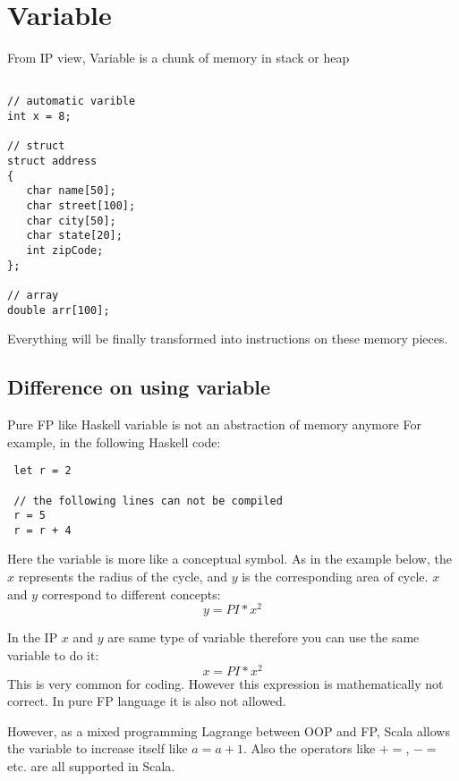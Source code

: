 \documentclass[notheorems, aspectratio=54]{beamer}
\begin{document}
\section{Variable}
\begin{frame}[fragile]

\begin{block}{From IP view, Variable is a chunk of memory in stack or heap}
\begin{verbatim}

// automatic varible
int x = 8;

// struct 
struct address 
{ 
   char name[50]; 
   char street[100]; 
   char city[50]; 
   char state[20]; 
   int zipCode;
};

// array
double arr[100];
\end{verbatim} 
\end{block}
Everything will be finally transformed into instructions on these memory pieces.

\end{frame}


\subsection{Difference on using variable}
\begin{frame}[fragile]

\begin{block}{Pure FP like Haskell variable is not an abstraction of memory anymore}
For example, in the following Haskell code:
\begin{verbatim}
 let r = 2
 
 // the following lines can not be compiled
 r = 5
 r = r + 4
\end{verbatim}
\end{block}

Here the variable is more like a conceptual symbol. As in the example below, 
the $x$ represents the radius of the cycle, and $y$ is the corresponding area of cycle. $x$ and $y$ correspond to different concepts:
\begin{equation}
y = PI*x^{2}
\end{equation}

\end{frame}

\begin{frame}[fragile]

In the IP $x$ and $y$ are same type of variable therefore you can use the same variable to do it:
\begin{equation}
x = PI*x^{2}
\end{equation}
This is very common for coding. However this expression is mathematically not correct. In pure FP language it is also not allowed.

However, as a mixed programming Lagrange between OOP and FP, Scala allows the variable to increase itself like $a = a + 1$.
Also the operators like $+=$, $-=$ etc. are all supported in Scala.

\end{frame}
\end{document}

